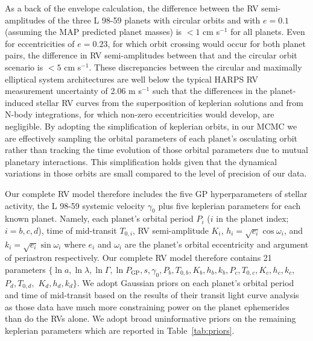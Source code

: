 \documentclass[longauth]{aa}
\newcommand{\mps}{m s$^{-1}$}
\begin{document}
As a back of the envelope calculation, the difference between the RV semi-amplitudes of the three L 98-59 planets with circular orbits and with $e=0.1$ (assuming the MAP predicted planet masses) is $<1$ cm s$^{-1}$ for all planets. Even for eccentricities of $e=0.23$, for which orbit crossing would occur for both planet pairs, the difference in RV semi-amplitudes between that and the circular orbit scenario is $<5$ cm s$^{-1}$. These discrepancies between the circular and maximally elliptical system architectures are well below the typical HARPS RV measurement uncertainty of 2.06 \mps{} such that the differences in the planet-induced stellar RV curves from the superposition of keplerian solutions and from N-body integrations, for which non-zero eccentricities would develop, are negligible. By adopting the simplification of keplerian orbits, in our MCMC we are effectively sampling the orbital parameters of each planet's osculating orbit rather than tracking the time evolution of those orbital parameters due to mutual planetary interactions. This simplification holds given that the dynamical variations in those orbits are small compared to the level of precision of our data.


Our complete RV model therefore includes the five GP hyperparameters of stellar activity, the L 98-59 systemic velocity $\gamma_0$ plus five keplerian parameters for each known planet. Namely, each planet's orbital period $P_i$ ($i$ in the planet index; $i=b,c,d$), time of mid-transit $T_{0,i}$, RV semi-amplitude $K_i$, $h_i=\sqrt{e_i}\cos{\omega_i}$, and $k_i=\sqrt{e_i}\sin{\omega_i}$ \citep{ford06} where $e_i$ and $\omega_i$ are the planet's orbital eccentricity and argument of periastron respectively. Our complete RV model therefore contains 21 parameters $\{\ln{a}, \ln{\lambda}, \ln{\Gamma}, \ln{P_{\text{GP}}}, s, \gamma_0, P_b, T_{0,b}, K_b, h_b, k_b, P_c, T_{0,c}, K_c, h_c, k_c,$ $P_d, T_{0,d},$ $K_d, h_d, k_d \}$. We adopt Gaussian priors on each planet's orbital period and time of mid-transit based on the results of their transit light curve analysis  as those data have much more constraining power on the planet ephemerides than do the RVs alone. We adopt broad uninformative priors on the remaining keplerian parameters which are reported in Table~\ref{tab:priors}.
\end{document}
